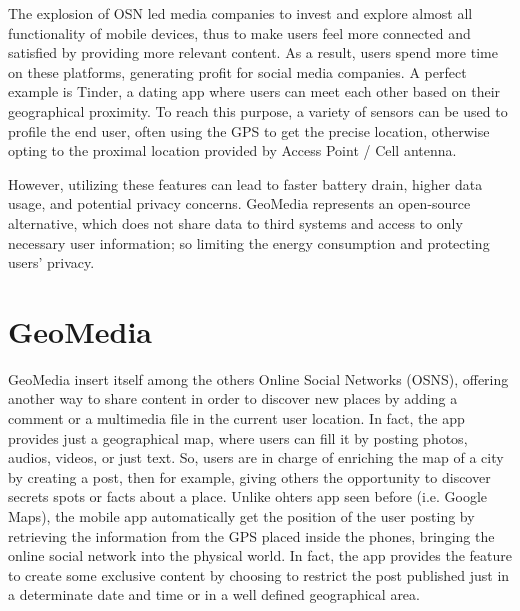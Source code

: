 \documentclass[conference]{IEEEtran}
\begin{document}
The explosion of OSN led media companies to invest and explore almost all functionality of mobile devices, thus to make users feel more connected and satisfied by providing more relevant content. As a result, users spend more time on these platforms, generating profit for social media companies.
A perfect example is Tinder, a dating app where users can meet each other based on their geographical proximity.
To reach this purpose, a variety of sensors can be used to profile the end user, often using the GPS to get the precise location, otherwise opting to the proximal location provided by Access Point / Cell antenna.

However, utilizing these features can lead to faster battery drain, higher data usage, and potential privacy concerns.
GeoMedia represents an open-source alternative, which does not share data to third systems and access to only necessary user information; so limiting the energy consumption and protecting users' privacy.
\\

\section{GeoMedia}

GeoMedia insert itself among the others Online Social Networks (OSNS), offering another way to share content in order to discover new places by adding a comment or a multimedia file in the current user location.
In fact, the app provides just a geographical map, where users can fill it by posting photos, audios, videos, or just text. So, users are in charge of enriching the map of a city by creating a post, then for example, giving others the opportunity to discover secrets spots or facts about a place.
Unlike ohters app seen before (i.e. Google Maps), the mobile app automatically get the position of the user posting by retrieving the information from the GPS placed inside the phones, bringing the online social network into the physical world. In fact, the app provides the feature to create some exclusive content by choosing to restrict the post published just in a determinate date and time or in a well defined geographical area.
\end{document}
